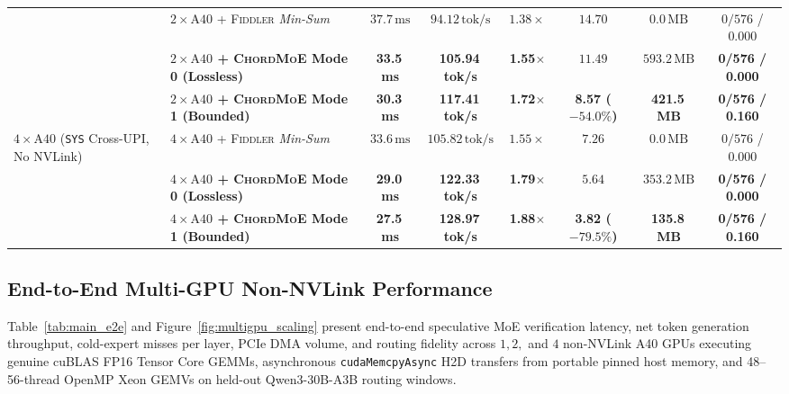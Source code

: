 \documentclass[10pt,twocolumn]{article}
\theoremstyle{definition}
\begin{document}
\begin{table}[t]
{\begin{tabular}{@{}llcccccc@{}}
      & $2\times\text{A40}$ + \textsc{Fiddler} \emph{Min-Sum} & $37.7\,\text{ms}$ & $94.12\,\text{tok/s}$ & $1.38\times$ & $14.70$ & $0.0\,\text{MB}$ & $0/576$ / $0.000$ \\
      & \textbf{$2\times\text{A40}$ + \textsc{ChordMoE} Mode 0 (Lossless)} & \textbf{33.5\,ms} & \textbf{105.94\,tok/s} & \textbf{1.55$\times$} & $11.49$ & $593.2\,\text{MB}$ & \textcolor{chordteal}{\textbf{0/576 / 0.000}} \\
      & \textbf{$2\times\text{A40}$ + \textsc{ChordMoE} Mode 1 (Bounded)} & \textbf{30.3\,ms} & \textbf{117.41\,tok/s} & \textbf{1.72$\times$} & \textbf{8.57 ($-54.0\%$)} & \textbf{421.5\,MB} & \textcolor{chordteal}{\textbf{0/576 / 0.160}} \\
    \midrule
    \multirow{3}{*}{$4\times\text{A40}$ (\texttt{SYS} Cross-UPI, No NVLink)}
      & $4\times\text{A40}$ + \textsc{Fiddler} \emph{Min-Sum} & $33.6\,\text{ms}$ & $105.82\,\text{tok/s}$ & $1.55\times$ & $7.26$ & $0.0\,\text{MB}$ & $0/576$ / $0.000$ \\
      & \textbf{$4\times\text{A40}$ + \textsc{ChordMoE} Mode 0 (Lossless)} & \textbf{29.0\,ms} & \textbf{122.33\,tok/s} & \textbf{1.79$\times$} & $5.64$ & $353.2\,\text{MB}$ & \textcolor{chordteal}{\textbf{0/576 / 0.000}} \\
      & \textbf{$4\times\text{A40}$ + \textsc{ChordMoE} Mode 1 (Bounded)} & \textbf{27.5\,ms} & \textbf{128.97\,tok/s} & \textbf{1.88$\times$} & \textbf{3.82 ($-79.5\%$)} & \textbf{135.8\,MB} & \textcolor{chordteal}{\textbf{0/576 / 0.160}} \\
    \bottomrule
  \end{tabular}%
  }
\end{table}

\subsection{End-to-End Multi-GPU Non-NVLink Performance}
\label{sec:eval_e2e}

Table~\ref{tab:main_e2e} and Figure~\ref{fig:multigpu_scaling} present end-to-end speculative MoE verification latency, net token generation throughput, cold-expert misses per layer, PCIe DMA volume, and routing fidelity across $1, 2,$ and $4$ non-NVLink A40 GPUs executing genuine cuBLAS FP16 Tensor Core GEMMs, asynchronous \texttt{cudaMemcpyAsync} H2D transfers from portable pinned host memory, and 48--56-thread OpenMP Xeon GEMVs on held-out Qwen3-30B-A3B routing windows.
\end{document}
